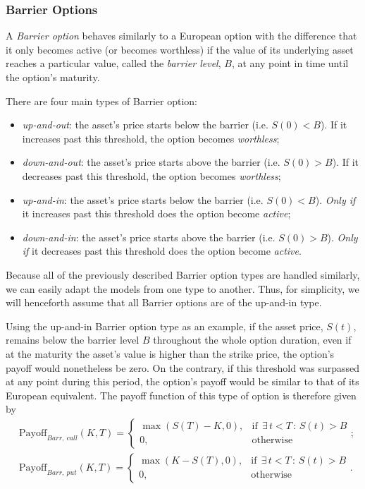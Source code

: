 \subsubsection{Barrier Options}
A \emph{Barrier option} behaves similarly to a European option with the difference that it only becomes active (or becomes worthless) if the value of its underlying asset reaches a particular value, called the \emph{barrier level}, $B$, at any point in time until the option's maturity.

There are four main types of Barrier option:
\begin{itemize}
\item \emph{up-and-out}: the asset's price starts below the barrier (i.e. $S(0)<B$). If it increases past this threshold, the option becomes \emph{worthless};
\item \emph{down-and-out}: the asset's price starts above the barrier (i.e. $S(0)>B$). If it decreases past this threshold, the option becomes \emph{worthless};
\item \emph{up-and-in}: the asset's price starts below the barrier (i.e. $S(0)<B$). \emph{Only if} it increases past this threshold does the option become \emph{active};
\item \emph{down-and-in}: the asset's price starts above the barrier (i.e. $S(0)>B$). \emph{Only if} it decreases past this threshold does the option become \emph{active}.
\end{itemize}

Because all of the previously described Barrier option types are handled similarly, we can easily adapt the models from one type to another. Thus, for simplicity, we will henceforth assume that all Barrier options are of the up-and-in type.

Using the up-and-in Barrier option type as an example, if the asset price, $S(t)$, remains below the barrier level $B$ throughout the whole option duration, even if at the maturity the asset's value is higher than the strike price, the option's payoff would nonetheless be zero. On the contrary, if this threshold was surpassed at any point during this period, the option's payoff would be similar to that of its European equivalent.
The payoff function of this type of option is therefore given by
\begin{equation}\label{barrier}
\begin{split}
&\text{Payoff}_{Barr,\ call}(K,T)=\begin{cases} 
      \max\left(S(T)-K,0\right), & \mathrm{if}\ \ \exists\,t<T\,:\,S(t)>B\\
      0, & \mathrm{otherwise}
   \end{cases};\\
&\text{Payoff}_{Barr,\ put}(K,T)=\begin{cases} 
      \max\left(K-S(T),0\right), & \mathrm{if}\ \ \exists\,t<T\,:\,S(t)>B\\
      0, & \mathrm{otherwise}
   \end{cases}.
\end{split}
\end{equation}


